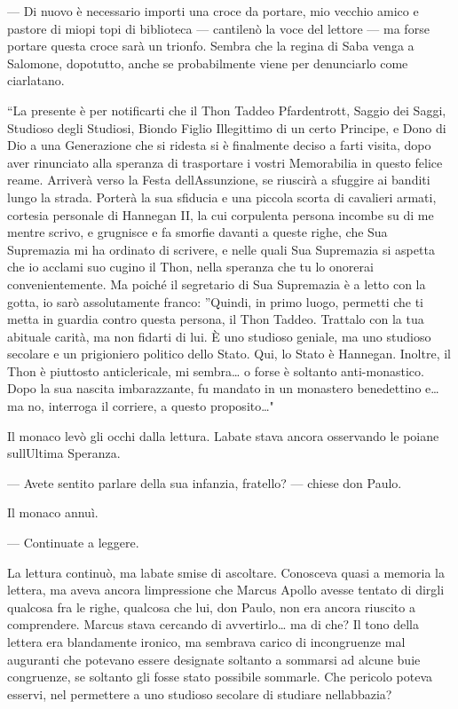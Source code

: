 --- Di nuovo è necessario importi una croce da portare, mio vecchio
amico e pastore di miopi topi di biblioteca --- cantilenò la voce del
lettore --- ma forse portare questa croce sarà un trionfo. Sembra che la
regina di Saba venga a Salomone, dopotutto, anche se probabilmente viene
per denunciarlo come ciarlatano.

``La presente è per notificarti che il Thon Taddeo Pfardentrott, Saggio
dei Saggi, Studioso degli Studiosi, Biondo Figlio Illegittimo di un
certo Principe, e Dono di Dio a una \textquotesingle Generazione che si
ridesta\textquotesingle{} si è finalmente deciso a farti visita, dopo
aver rinunciato alla speranza di trasportare i vostri Memorabilia in
questo felice reame. Arriverà verso la Festa
dell\textquotesingle Assunzione, se riuscirà a sfuggire ai banditi lungo
la strada. Porterà la sua sfiducia e una piccola scorta di cavalieri
armati, cortesia personale di Hannegan II, la cui corpulenta persona
incombe su di me mentre scrivo, e grugnisce e fa smorfie davanti a
queste righe, che Sua Supremazia mi ha ordinato di scrivere, e nelle
quali Sua Supremazia si aspetta che io acclami suo cugino il Thon, nella
speranza che tu lo onorerai convenientemente. Ma poiché il segretario di
Sua Supremazia è a letto con la gotta, io sarò assolutamente franco:
''Quindi, in primo luogo, permetti che ti metta in guardia contro questa
persona, il Thon Taddeo. Trattalo con la tua abituale carità, ma non
fidarti di lui. È uno studioso geniale, ma uno studioso secolare e un
prigioniero politico dello Stato. Qui, lo Stato è Hannegan. Inoltre, il
Thon è piuttosto anticlericale, mi sembra\ldots{} o forse è soltanto
anti-monastico. Dopo la sua nascita imbarazzante, fu mandato in un
monastero benedettino e\ldots{} ma no, interroga il corriere, a questo
proposito\ldots"

Il monaco levò gli occhi dalla lettura. L\textquotesingle abate stava
ancora osservando le poiane sull\textquotesingle Ultima Speranza.

--- Avete sentito parlare della sua infanzia, fratello? --- chiese don
Paulo.

Il monaco annuì.

--- Continuate a leggere.

La lettura continuò, ma l\textquotesingle abate smise di ascoltare.
Conosceva quasi a memoria la lettera, ma aveva ancora
l\textquotesingle impressione che Marcus Apollo avesse tentato di dirgli
qualcosa fra le righe, qualcosa che lui, don Paulo, non era ancora
riuscito a comprendere. Marcus stava cercando di avvertirlo\ldots{} ma
di che? Il tono della lettera era blandamente ironico, ma sembrava
carico di incongruenze mal auguranti che potevano essere designate
soltanto a sommarsi ad alcune buie congruenze, se soltanto gli fosse
stato possibile sommarle. Che pericolo poteva esservi, nel permettere a
uno studioso secolare di studiare nell\textquotesingle abbazia?

